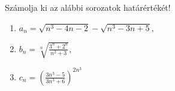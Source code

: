 \documentclass[11pt]{scrartcl}
\begin{document}
Számolja ki az alábbi sorozatok határértékét!
\begin{enumerate}
	\item \(\displaystyle
	      a_n = \sqrt{n^3 - 4n - 2} - \sqrt{n^3 - 3n + 5},
	      \)

	\item \(\displaystyle
	      b_n = \sqrt[n]{\frac{3^n + 2^n}{n^2 + 3}},
	      \)

	\item \(\displaystyle
	      c_n = \left(
	      \frac{3n^3 - 5}{3n^3 + 6}
	      \right)^{2n^3}
	      \)
\end{enumerate}
\end{document}
